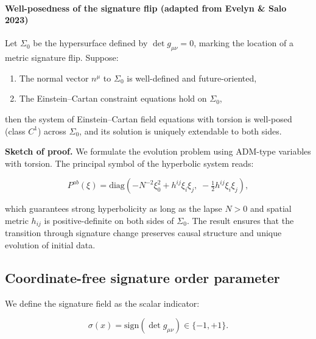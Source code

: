 \documentclass{article}
\begin{document}
\vspace{1.5em}
\paragraph{Well-posedness of the signature flip (adapted from Evelyn \& Salo 2023)}

Let \(\Sigma_0\) be the hypersurface defined by \(\det g_{\mu\nu} = 0\), marking the location of a metric signature flip. Suppose:

\begin{enumerate}
    \item The normal vector \(n^\mu\) to \(\Sigma_0\) is well-defined and future-oriented,
    \item The Einstein–Cartan constraint equations hold on \(\Sigma_0\),
\end{enumerate}

then the system of Einstein–Cartan field equations with torsion is well-posed (class \(C^1\)) across \(\Sigma_0\), and its solution is uniquely extendable to both sides.

\vspace{1ex}
\noindent
\textbf{Sketch of proof.} We formulate the evolution problem using ADM-type variables with torsion. The principal symbol of the hyperbolic system reads:

\begin{equation}
P^{ab}(\xi) = \mathrm{diag}\left(-N^{-2}\xi_0^2 + h^{ij}\xi_i\xi_j,\; -\tfrac{1}{2}h^{ij}\xi_i\xi_j\right),
\end{equation}

which guarantees strong hyperbolicity as long as the lapse \(N > 0\) and spatial metric \(h_{ij}\) is positive-definite on both sides of \(\Sigma_0\). The result ensures that the transition through signature change preserves causal structure and unique evolution of initial data.






 \subsection*{ Coordinate-free signature order parameter}
\label{sec:sig-invariant}

We define the signature field as the scalar indicator:

\begin{equation}
\sigma(x) = \mathrm{sign}(\det g_{\mu\nu}) \in \{-1, +1\}.
\end{equation}
\end{document}
